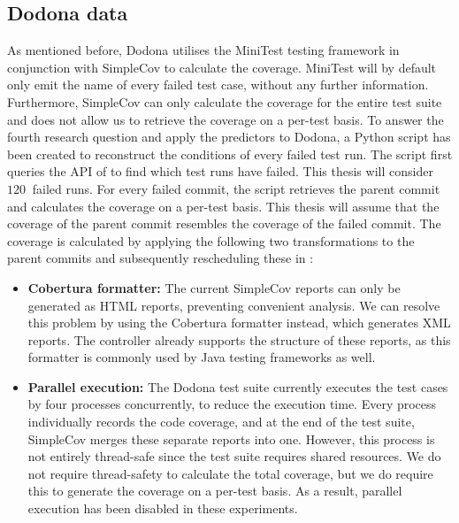 
\subsection{Dodona data}
As mentioned before, Dodona utilises the MiniTest testing framework in conjunction with SimpleCov to calculate the coverage. MiniTest will by default only emit the name of every failed test case, without any further information. Furthermore, SimpleCov can only calculate the coverage for the entire test suite and does not allow us to retrieve the coverage on a per-test basis. To answer the fourth research question and apply the \velocity{} predictors to Dodona, a Python script has been created to reconstruct the conditions of every failed test run. The script first queries the API of \githubactions{} to find which test runs have failed. This thesis will consider $\SI{120}{}$ failed runs. For every failed commit, the script retrieves the parent commit and calculates the coverage on a per-test basis. This thesis will assume that the coverage of the parent commit resembles the coverage of the failed commit. The coverage is calculated by applying the following two transformations to the parent commits and subsequently rescheduling these in \githubactions{}:

\begin{itemize}
	\item \textbf{Cobertura formatter:} The current SimpleCov reports can only be generated as HTML reports, preventing convenient analysis. We can resolve this problem by using the Cobertura formatter instead, which generates XML reports. The controller already supports the structure of these reports, as this formatter is commonly used by Java testing frameworks as well.
	
	\item \textbf{Parallel execution:} The Dodona test suite currently executes the test cases by four processes concurrently, to reduce the execution time. Every process individually records the code coverage, and at the end of the test suite, SimpleCov merges these separate reports into one. However, this process is not entirely thread-safe since the test suite requires shared resources. We do not require thread-safety to calculate the total coverage, but we do require this to generate the coverage on a per-test basis. As a result, parallel execution has been disabled in these experiments.
	
\end{itemize}